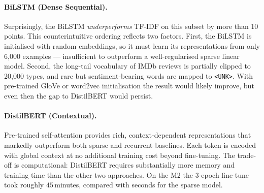 \paragraph{BiLSTM (Dense Sequential).} Surprisingly, the BiLSTM
\emph{underperforms} TF-IDF on this subset by more than 10 points. This
counterintuitive ordering reflects two factors. First, the BiLSTM is
initialised with random embeddings, so it must learn its representations
from only 6{,}000 examples --- insufficient to outperform a
well-regularised sparse linear model. Second, the long-tail vocabulary
of IMDb reviews is partially clipped to 20{,}000 types, and rare but
sentiment-bearing words are mapped to \texttt{<UNK>}. With pre-trained
GloVe or word2vec initialisation the result would likely improve, but
even then the gap to DistilBERT would persist.

\paragraph{DistilBERT (Contextual).} Pre-trained self-attention provides
rich, context-dependent representations that markedly outperform both
sparse and recurrent baselines. Each token is encoded with global
context at no additional training cost beyond fine-tuning. The
trade-off is computational: DistilBERT requires substantially more
memory and training time than the other two approaches. On the M2 the
3-epoch fine-tune took roughly $45$\,minutes, compared with seconds for
the sparse model.